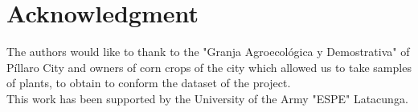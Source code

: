 \documentclass[conference]{IEEEtran}
\begin{document}


\section*{Acknowledgment}

The authors would like to thank to the "Granja Agroecol\'ogica y Demostrativa" of P\'illaro City and owners of corn crops of the city which allowed us to take samples of plants, to obtain to conform the dataset of the project. \\

This work has been supported by the University of the Army "ESPE"  Latacunga.  



\end{document}
